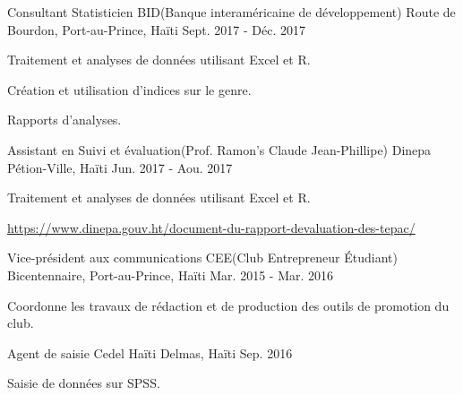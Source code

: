 \begin{cventries}

\cventry
{Consultant Statisticien} %
{BID(Banque interaméricaine de développement)} %
{Route de Bourdon, Port-au-Prince, Ha\"iti} %
{Sept. 2017 - Déc. 2017} %
{ %
\begin{cvitems}
\item {Traitement et analyses de données utilisant Excel et R.}
\item {Création et utilisation d'indices sur le genre.}
\item {Rapports d'analyses.}
\end{cvitems}
}


\cventry
{Assistant en Suivi et évaluation(Prof. Ramon's Claude Jean-Phillipe)} %
{Dinepa} %
{Pétion-Ville, Ha\"iti} %
{Jun. 2017 - Aou. 2017} %
{ %
\begin{cvitems}
\item {Traitement et analyses de données utilisant Excel et R.}
\item {\url{https://www.dinepa.gouv.ht/document-du-rapport-devaluation-des-tepac/}}
\end{cvitems} 
}


\cventry
{Vice-président aux communications} %
{CEE(Club Entrepreneur \'Etudiant)} %
{Bicentennaire, Port-au-Prince, Ha\"iti} %
{Mar. 2015 - Mar. 2016} %
{ %
\begin{cvitems}
\item {Coordonne les travaux de rédaction et de production des outils de promotion du club.}
\end{cvitems}
}


\cventry
{Agent de saisie} %
{Cedel Ha\"iti} %
{Delmas, Ha\"iti} %
{Sep. 2016} %
{ %
\begin{cvitems}
\item {Saisie de données sur SPSS.}
\end{cvitems}
}



\end{cventries}
